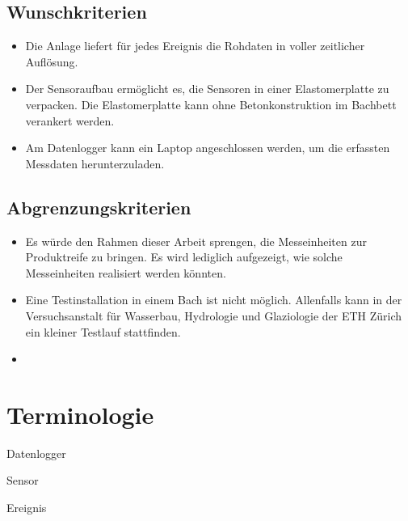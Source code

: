 \subsection{Wunschkriterien}
\begin{itemize}
\item Die Anlage liefert für jedes Ereignis die Rohdaten in voller zeitlicher Auflösung.
\item Der Sensoraufbau ermöglicht es, die Sensoren in einer Elastomerplatte zu verpacken. Die Elastomerplatte kann ohne Betonkonstruktion im Bachbett verankert werden.
\item Am Datenlogger kann ein Laptop angeschlossen werden, um die erfassten Messdaten herunterzuladen.
\end{itemize}
\subsection{Abgrenzungskriterien}
\begin{itemize}
\item Es würde den Rahmen dieser Arbeit sprengen, die Messeinheiten zur Produktreife zu bringen. Es wird lediglich aufgezeigt, wie solche Messeinheiten realisiert werden könnten.
\item Eine Testinstallation in einem Bach ist nicht möglich. Allenfalls kann in der Versuchsanstalt für Wasserbau, Hydrologie und Glaziologie der ETH Zürich ein kleiner Testlauf stattfinden.
\item
\end{itemize}

\section{Terminologie}\label{sec.terminologie}
Datenlogger

Sensor

Ereignis
